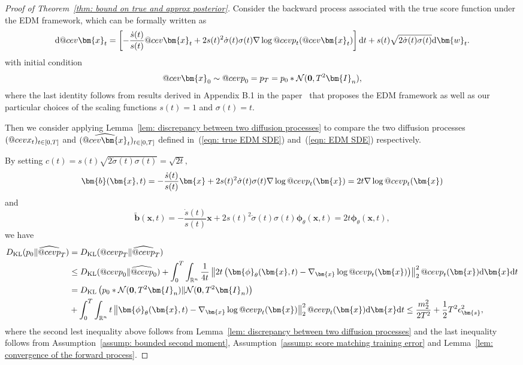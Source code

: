 \documentclass{article}
\makeatletter
\numberwithin{equation}{section}
\def\eqref#1{(\ref{#1})}
\newcommand{\dif}{{\mathrm{d}}}
\def\vb{{\bm{b}}}
\def\vs{{\bm{s}}}
\def\vw{{\bm{w}}}
\def\vx{{\bm{x}}}
\def\vphi{{\bm{\phi}}}
\def\mI{{\bm{I}}}
\def\gN{{\mathcal{N}}}
\newcommand{\KL}{D_{\mathrm{KL}}}
\DeclareRobustCommand{\cev}[1]{%
  {\mathpalette\do@cev{#1}}%
}
\newcommand{\do@cev}[2]{%
  \vbox{\offinterlineskip
    \sbox\z@{$\m@th#1 x$}%
    \ialign{##\cr
      \hidewidth\reflectbox{$\m@th#1\vec{}\mkern4mu$}\hidewidth\cr
      \noalign{\kern-\ht\z@}
      $\m@th#1#2$\cr
    }%
  }%
}
\makeatother
\begin{document}
\begin{proof}[Proof of Theorem~\ref{thm: bound on true and approx posterior}]
Consider the backward process associated with the true score function under the EDM framework, which can be formally written as
\begin{equation}
\label{eqn: true EDM SDE}
\dif \cev{\vx}_t = \left[-\frac{\dot{s}(t)}{s(t)}\cev{\vx}_t + 2s(t)^2\dot{\sigma}(t)\sigma(t)\nabla \log \cev{p}_t(\cev{\vx}_t)\right]\dif t + s(t)\sqrt{2\dot{\sigma}(t)\sigma(t)}\dif \vw_t.    
\end{equation}
with initial condition 
$$
    \cev{\vx}_0 \sim \cev{p}_0 = p_{T} = p_0 \ast \gN(\boldsymbol{0}, T^2\mI_n),
$$ 
where the last identity follows from results derived in Appendix B.1 in the paper~\cite{karras2022elucidating} that proposes the EDM framework as well as our particular choices of the scaling functions $s(t)=1$ and $\sigma(t)=t$. 

Then we consider applying Lemma~\ref{lem: discrepancy between two diffusion processes} to compare the two diffusion processes $(\cev{x}_t)_{t \in [0,T]}$ and $(\widehat{\cev{\vx}}_t)_{t \in [0,T]}$ defined in~\eqref{eqn: true EDM SDE} and~\eqref{eqn: EDM SDE} respectively. 

By setting $c(t) = s(t)\sqrt{2\dot{\sigma}(t)\sigma(t)} = \sqrt{2t},$ 
$$\vb(\vx,t) = -\frac{\dot{s}(t)}{s(t)}\vx + 2s(t)^2\dot{\sigma}(t)\sigma(t)\nabla \log \cev{p}_t(\vx) = 2t\nabla \log \cev{p}_t(\vx)$$ and $$\widetilde{\vb}(\vx,t) = -\frac{\dot{s}(t)}{s(t)}\vx + 2s(t)^2\dot{\sigma}(t)\sigma(t)\vphi_\theta(\vx,t) = 2t\vphi_\theta(\vx,t),$$ 
we have
\begin{equation}
\begin{aligned}
\KL(p_0 \| \widehat{\cev{p}}_T) &= \KL(\cev{p}_T \| \widehat{\cev{p}}_T)\\
&\leq \KL(\cev{p}_0 \| \widehat{\cev{p}}_0) + \int_{0}^{T}\int_{\mathbb{R}^n}\frac{1}{4t}\left\|2t\left(\vphi_{\theta}(\vx,t)-\nabla_{\vx}\log \cev{p}_{t}(\vx)\right)\right\|_2^2\cev{p}_t(\vx)\dif\vx\dif t\\
&= \KL\left(p_0 \ast \gN(\boldsymbol{0},T^2\mI_n) \| \gN(\boldsymbol{0},T^2\mI_n)\right) \\
&+ \int_{0}^{T}\int_{\mathbb{R}^n}t\left\|\vphi_{\theta}(\vx,t)-\nabla_{\vx}\log \cev{p}_{t}(\vx)\right\|_2^2\cev{p}_t(\vx)\dif\vx\dif t \leq \frac{m_2^2}{2T^2} + \frac{1}{2}T^2\epsilon_{\vs}^2,
\end{aligned}    
\end{equation}
where the second lest inequality above follows from Lemma~\ref{lem: discrepancy between two diffusion processes} and the last inequality follows from Assumption~\ref{assump: bounded second moment}, Assumption~\ref{assump: score matching training error} and Lemma~\ref{lem: convergence of the forward process}. 


\end{proof}
\end{document}
